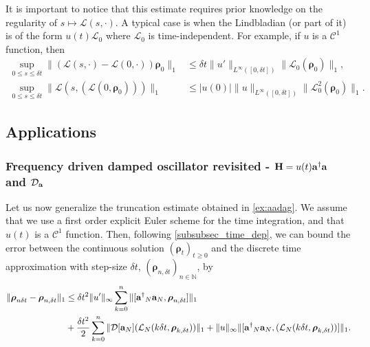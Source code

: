\documentclass[a4paper,onecolumn,amsmath,amssymb,amsfonts,accepted=2026-03-06]{quantumarticle}
\newcommand{\xL}{\mathcal{L}}
\newcommand{\xN}{\mathbb{N}}
\newcommand{\cD}{\mathcal D}
\newcommand{\Hamil}{{\bf H}}
\newcommand{\destroy}{{\bf a}}
\newcommand{\create}{{\bf a^\dag}}
\begin{document}
It is important to notice that this estimate requires prior knowledge on the regularity of $s\mapsto \xL(s,\cdot)$. A typical case is when the Lindbladian (or part of it) is of the form $u(t)\xL_0$ where $\xL_0$ is time-independent. For example, if $u$ is a $\mathcal{C}^1$ function, then
\begin{align}
    \sup_{0 \leq s \leq \delta t} \| (\xL(s,\cdot)-\xL(0,\cdot))\boldsymbol{\rho}_0\|_1 &\leq \delta t \|u'\|_{L^\infty([0,\delta t])} \|\xL_0(\boldsymbol{\rho}_0)\|_1,\\
    \sup_{0 \leq s \leq \delta t} \|\xL(s,(\xL(0,\boldsymbol{\rho}_0)))\|_1 & \leq |u(0)| \|u\|_{L^\infty([0,\delta t])} \|\xL_0^2(\boldsymbol{\rho}_0)\|_1.
\end{align}
\subsection{Applications}
\subsubsection{\texorpdfstring{Frequency driven damped oscillator revisited - $\Hamil = u(t) \create \destroy$ and $\cD_{\destroy}$}{Frequency driven damped oscillator revisited}}
\label{ex:aadag_st}
Let us now generalize the truncation estimate obtained in \cref{ex:aadag}. We assume that we use a first order explicit Euler scheme for the time integration, and that $u(t)$ is a $\mathcal{C}^1$ function.
Then, following \cref{subsubsec_time_dep}, we can bound the error between the continuous solution $(\boldsymbol{\rho}_t)_{t\geq 0}$ and the discrete time approximation with step-size $\delta t$, $(\boldsymbol{\rho}_{n,\delta t})_{n\in \xN}$, by
\begin{align}
    \notag
    \|\boldsymbol{\rho}_{n\delta t}-\boldsymbol{\rho}_{n,\delta t}\|_1 &\leq \delta t ^2 \|u'\|_\infty \sum_{k=0}^n \|[\create_N \destroy_N,\boldsymbol{\rho}_{n,\delta t}]\|_1 \\
    &+\frac{\delta t^2}{2} \sum_{k=0}^n \|\cD[\destroy_N](\xL_N(k \delta t,\boldsymbol{\rho}_{k,\delta t}))\|_1 + \|u\|_\infty \|[\create_N \destroy_N,(\xL_N(k \delta t,\boldsymbol{\rho}_{k,\delta t}))]\|_1.
\end{align}
\end{document}
